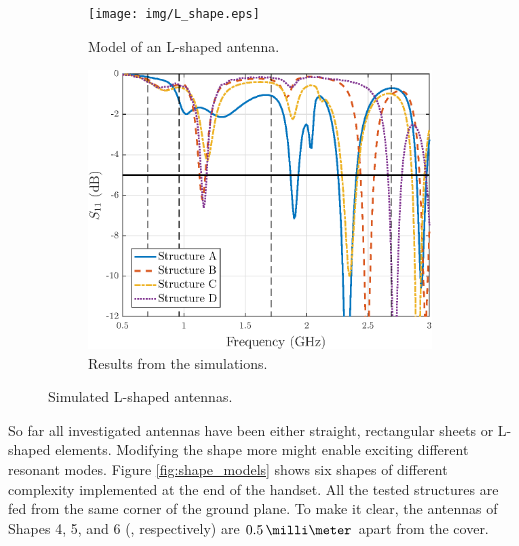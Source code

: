 \begin{figure}[H]
    \centering
    \begin{subfigure}[b]{0.49\textwidth}
        \texttt{[image: img/L\_shape.eps]}
        \caption{Model of an L-shaped antenna.}
        \label{fig:l_shape_model}
    \end{subfigure}
    \begin{subfigure}[b]{0.49\textwidth}
        \includegraphics[width=\textwidth]{img/L_shape_res.eps}
        \caption{Results from the simulations.}
        \label{fig:l_shape_res}
    \end{subfigure}
    \caption{Simulated L-shaped antennas.}
    \label{fig:l_shape}
\end{figure}

So far all investigated antennas have been either straight, rectangular sheets or L-shaped elements. Modifying the shape more might enable exciting different resonant modes. Figure \ref{fig:shape_models} shows six shapes of different complexity implemented at the end of the handset. All the tested structures are fed from the same corner of the ground plane. To make it clear, the antennas of Shapes 4, 5, and 6 (, respectively) are $0.5\,\milli\meter$ apart from the cover.

